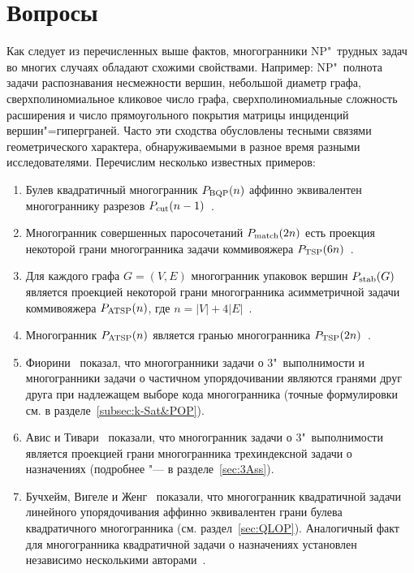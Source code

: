 \section{Вопросы}
\label{sec:questions}



Как следует из перечисленных выше фактов, многогранники NP"~трудных задач во многих случаях обладают схожими свойствами. Например: NP"~полнота задачи распознавания несмежности вершин, небольшой диаметр графа, сверхполиномиальное кликовое число графа, сверхполиномиальные сложность расширения и число прямоугольного покрытия матрицы инциденций вершин"=гиперграней.
Часто эти сходства обусловлены тесными связями геометрического характера, обнаруживаемыми в разное время разными исследователями. 
Перечислим несколько известных примеров:
\begin{enumerate}
\item Булев квадратичный многогранник $P_{\textup{BQP}}(n)$ аффинно эквивалентен многограннику разрезов $P_{\textup{cut}}(n-1)$~\cite[раздел~5.2]{Deza:2001}.
\item Многогранник совершенных паросочетаний $P_{\textup{match}}(2n)$ есть проекция
некоторой грани многогранника задачи коммивояжера $P_{\textup{TSP}}(6n)$~\cite{Yannakakis:1991}.
\item Для каждого графа $G = (V,E)$ многогранник упаковок вершин $P_{\textup{stab}}(G)$ является проекцией некоторой грани многогранника асимметричной задачи коммивояжера $P_{\textup{ATSP}}(n)$, где $n = |V| + 4|E|$~\cite{Yannakakis:1991}.
\item Многогранник $P_{\textup{ATSP}}(n)$ является гранью многогранника $P_{\textup{TSP}}(2n)$~\cite{Junger:1995TSP}.
\item Фиорини~\cite{Fiorini:2003} показал, что многогранники задачи о 3"~выполнимости и многогранники задачи о частичном упорядочивании являются гранями друг друга при надлежащем выборе кода многогранника (точные формулировки см. в разделе~\ref{subsec:k-Sat&POP}).
\item Авис и Тивари~\cite{AvisTiwary:2015} показали, что многогранник задачи о 3"~выполнимости является проекцией грани многогранника трехиндексной задачи о назначениях (подробнее "--- в разделе~\ref{sec:3Ass}).
\item Бучхейм, Вигеле и Женг~\cite{Buchheim:2010} показали, что многогранник квадратичной задачи линейного упорядочивания аффинно эквивалентен грани булева квадратичного многогранника (см. раздел~\ref{sec:QLOP}).
Аналогичный факт для многогранника квадратичной задачи о назначениях установлен независимо несколькими авторами~\cite{Rijal:1995, Kaibel:1997, Saito:2009}.
\end{enumerate}
